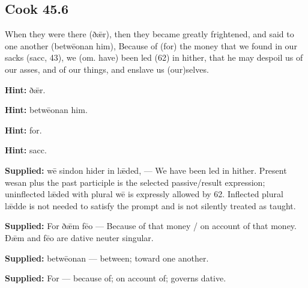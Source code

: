 \par\begin{minipage}{\linewidth}\raggedright
\subsection*{Cook 45.6}

When they were there (ðǣr), then they became greatly frightened, and said to one another (betwēonan him), Because of (for) the money that we found in our sacks (sacc, 43), we (om. have) been led (62) in hither, that he may despoil us of our asses, and of our things, and enslave us (our)selves.

\textbf{Hint:} ðǣr.

\textbf{Hint:} betwēonan him.

\textbf{Hint:} for.

\textbf{Hint:} sacc.

\end{minipage}\par\addvspace{4pt}

\textbf{Supplied:} wē sindon hider in lǣded, — We have been led in hither. Present wesan plus the past participle is the selected passive/\allowbreak{}result expression; uninflected lǣded with plural wē is expressly allowed by 62. Inflected plural lǣdde is not needed to satisfy the prompt and is not silently treated as taught.

\textbf{Supplied:} For ðǣm fēo — Because of that money /\allowbreak{} on account of that money. Ðǣm and fēo are dative neuter singular.

\textbf{Supplied:} betwēonan — between; toward one another.

\textbf{Supplied:} For — because of; on account of; governs dative.

